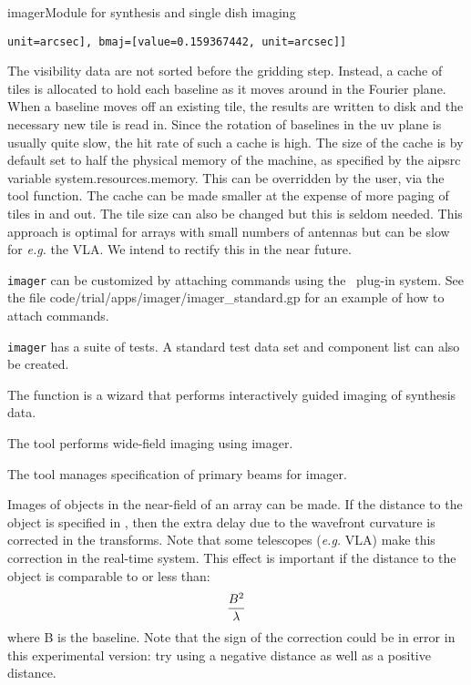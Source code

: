 \begin{ahmodule}{imager}{Module for synthesis and single dish imaging}
\begin{description}
\begin{verbatim}
unit=arcsec], bmaj=[value=0.159367442, unit=arcsec]] 
\end{verbatim}
\item[A novel sort-less gridding algorithm] The visibility data are
not sorted before the gridding step. Instead, a cache of tiles is
allocated to hold each baseline as it moves around in the Fourier
plane. When a baseline moves off an existing tile, the results are
written to disk and the necessary new tile is read in. Since the
rotation of baselines in the uv plane is usually quite slow, the hit
rate of such a cache is high. The size of the cache is by default
set to half the physical memory of the machine, as specified
by the aipsrc variable system.resources.memory. This can be overridden
by the user, via the 
tool function. The cache
can be made smaller at the expense of more paging of tiles in and
out. The tile size can also be changed but this is seldom needed.
This approach is optimal for arrays with small numbers of antennas
but can be slow for {\em e.g.} the VLA. We intend to rectify this
in the near future.
\item[Plug-in commands] {\tt imager} can be customized by attaching
commands using the \aipspp\ plug-in system. See the file
code/trial/apps/imager/imager\_standard.gp for an example of how to 
attach commands. 
\item[Suite of tests] {\tt imager} has a suite of tests. A standard 
test data set and component list can also be created.
\item[imagerwizard] The 
function is a wizard that performs interactively guided imaging
of synthesis data.
\item[dragon] The  tool performs 
wide-field imaging using imager.
\item[vpmanager] The  tool manages
specification of primary beams for imager.
\item[Near-field imaging {\em experimental}] Images of objects in the near-field of an
array can be made. If the distance to the object is specified 
in , then the extra delay
due to the wavefront curvature is corrected in the transforms.
Note that some telescopes ({\em e.g.} VLA) make this correction in the real-time
system. This effect is important if the distance to the object is comparable
to or less than:
\begin{equation}
{B^2\over\lambda}
\end{equation}
where B is the baseline. Note that the sign of the correction could be
in error in this experimental version: try using a negative distance
as well as a positive distance.
\end{description}


\end{ahmodule}
